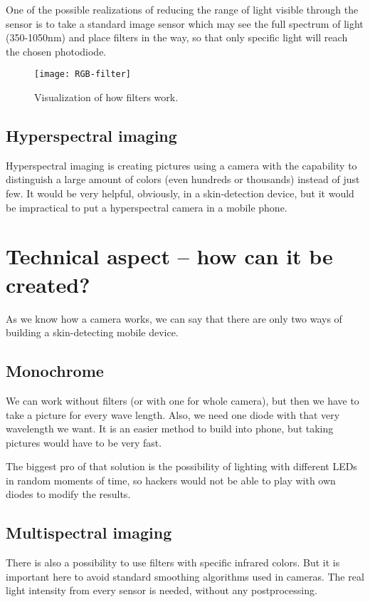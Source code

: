             One of the possible realizations of reducing the range
            of light visible through the sensor is to take a standard image sensor which
            may see the full spectrum of light (350-1050nm) and place filters
            in the way, so that only specific light will reach the chosen photodiode.

            \begin{figure}[H]
                \caption{Visualization of how filters work.}
                \centering
                \texttt{[image: RGB-filter]}
                \label{fig:RGB-filter}
            \end{figure}

        \subsection*{Hyperspectral imaging}
            Hyperspectral imaging is creating pictures using a camera with the
            capability to distinguish a large amount of colors
            (even hundreds or thousands) instead of just few.
            It would be very helpful, obviously, in a skin-detection device,
            but it would be impractical to put a hyperspectral camera in a mobile phone.

    \section{Technical aspect -- how can it be created?}
        As we know how a camera works, we can say that there are only two ways of
        building a skin-detecting mobile device.
        \subsection*{Monochrome}
            We can work without filters (or with one for whole camera),
            but then we have to take a picture for every wave length.
            Also, we need one diode with that very wavelength we want.
            It is an easier method to build into phone, but taking pictures
            would have to be very fast.

            The biggest pro of that solution is the possibility of lighting
            with different LEDs in random moments of time, so hackers
            would not be able to play with own diodes to modify the results.

        \subsection*{Multispectral imaging}
            There is also a possibility to use filters with specific infrared colors.
            But it is important here to avoid standard smoothing algorithms used
            in cameras.
            The real light intensity from every sensor is needed,
            without any postprocessing.

